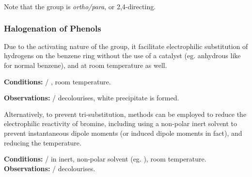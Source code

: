 			Note that the  group is \textit{ortho/para}, or 2,4-directing.

			\pagebreak
			\subsubsection{Halogenation of Phenols}

				Due to the activating nature of the  group, it facilitate electrophilic substitution of hydrogens on the benzene ring
				without the use of a catalyst (eg. anhydrous  like for normal benzene), and at room temperature as well.


				\vspace{1.5em}
				\vbox{\textbf{Conditions:}	\tabto{35mm} / \ch{\chlorine 2 \stAq}, room temperature.}

				\vspace{0.75em}
				\vbox{\textbf{Observations:}\tabto{35mm}  /   decolourises,			\tabto{35mm}white precipitate is formed.}



				Alternatively, to prevent tri-substitution, methods can be employed to reduce the electrophilic reactivity of bromine, including
				using a non-polar inert solvent to prevent instantaneous dipole moments (or induced dipole moments in fact), and reducing
				the temperature.



				\vspace{1.5em}
				\vbox{\textbf{Conditions:}	\tabto{35mm} / \ch{\chlorine 2 \stG} in inert, non-polar solvent (eg. ), room temperature.}
				\vbox{\textbf{Observations:}\tabto{35mm}  /   decolourises.}




